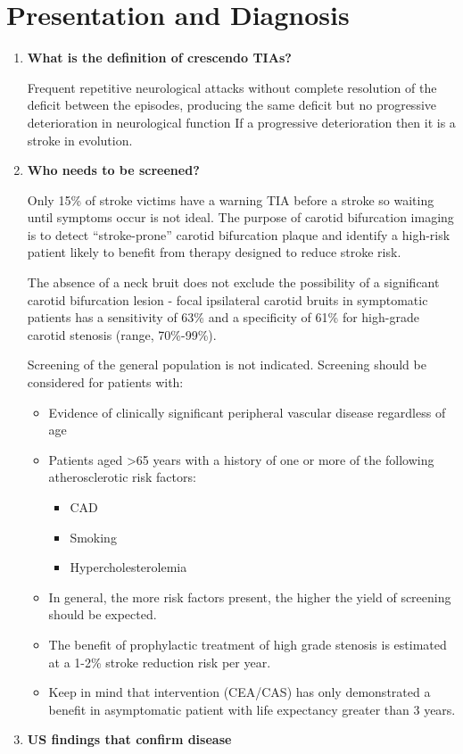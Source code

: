 \documentclass[
]{book}
\begin{document}
\hypertarget{presentation-and-diagnosis}{%
\section{Presentation and Diagnosis}\label{presentation-and-diagnosis}}

\begin{enumerate}
\def\labelenumi{\arabic{enumi}.}
\item
  \textbf{What is the definition of crescendo TIAs?}

  Frequent repetitive neurological attacks without complete resolution
  of the deficit between the episodes, producing the same deficit but
  no progressive deterioration in neurological function If a
  progressive deterioration then it is a stroke in evolution.
\item
  \textbf{Who needs to be screened?}

  Only 15\% of stroke victims have a warning TIA before a stroke so
  waiting until symptoms occur is not ideal. The purpose of carotid
  bifurcation imaging is to detect ``stroke-prone'' carotid bifurcation
  plaque and identify a high-risk patient likely to benefit from
  therapy designed to reduce stroke risk.

  The absence of a neck bruit does not exclude the possibility of a
  significant carotid bifurcation lesion - focal ipsilateral carotid
  bruits in symptomatic patients has a sensitivity of 63\% and a
  specificity of 61\% for high-grade carotid stenosis (range, 70\%-99\%).

  Screening of the general population is not indicated. Screening
  should be considered for patients with:

  \begin{itemize}
  \item
    Evidence of clinically significant peripheral vascular disease
    regardless of age
  \item
    Patients aged \textgreater65 years with a history of one or more of the
    following atherosclerotic risk factors:

    \begin{itemize}
    \item
      CAD
    \item
      Smoking
    \item
      Hypercholesterolemia
    \end{itemize}
  \item
    In general, the more risk factors present, the higher the yield
    of screening should be expected.
  \item
    The benefit of prophylactic treatment of high grade stenosis is
    estimated at a 1-2\% stroke reduction risk per year.
    \citep{naylorWhyManagementAsymptomatic2015}
  \item
    Keep in mind that intervention (CEA/CAS) has only demonstrated a
    benefit in asymptomatic patient with life expectancy greater
    than 3 years. \citep{bulbuliaAsymptomaticCarotidSurgery2017, halliday10yearStrokePrevention2010, rosenfieldRandomizedTrialStent2016}
  \end{itemize}
\item
  \textbf{US findings that confirm disease}


\end{enumerate}
\end{document}
